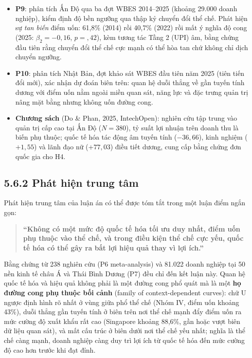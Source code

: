 \documentclass[
  a4paper,
  13pt]{extreport}
\begin{document}
\begin{itemize}
  hạn chế ba cụm và mang tính minh họa, nhạy cảm với phiên bản dữ liệu
  (xem Mục 4.7.8).
\item
  \textbf{P9}: phân tích Ấn Độ qua ba đợt WBES 2014--2025 (khoảng 29.000
  doanh nghiệp), kiểm định độ bền ngưỡng qua thập kỷ chuyển đổi thể chế.
  Phát hiện sự \emph{tan biến} điểm uốn: 61,8\% (2014) rồi 40,7\% (2022)
  rồi mất ý nghĩa độ cong (2025: \(\beta_2 = -0{,}16\), \(p = {,}42\)),
  kèm tương tác Tầng 2 (UPI) âm, bằng chứng đầu tiên rằng chuyển đổi thể
  chế cực mạnh có thể hòa tan chứ không chỉ dịch chuyển ngưỡng.
\item
  \textbf{P10}: phân tích Nhật Bản, đợt khảo sát WBES đầu tiên năm 2025
  (tiên tiến đổi mới), xác nhận dự đoán biên trên: quan hệ duỗi thẳng về
  gần tuyến tính dương với điểm uốn nằm ngoài miền quan sát, năng lực và
  đặc trưng quản trị nâng mặt bằng nhưng không uốn đường cong.
\item
  \textbf{Chương sách} (Do \& Phan, 2025, IntechOpen): nghiên cứu tập
  trung vào quản trị cấp cao tại Ấn Độ (\(N = 380\)), tỷ suất lợi nhuận
  trên doanh thu là biến phụ thuộc; quốc tế hóa tác động âm tuyến tính
  (\(-36{,}66\)), kinh nghiệm (\(+1{,}55\)) và lãnh đạo nữ
  (\(+77{,}03\)) điều tiết dương, cung cấp bằng chứng đơn quốc gia cho
  H4.
\end{itemize}

\hypertarget{phuxe1t-hiux1ec7n-trung-tuxe2m}{%
\subsection{5.6.2 Phát hiện trung
tâm}\label{phuxe1t-hiux1ec7n-trung-tuxe2m}}

Phát hiện trung tâm của luận án có thể được tóm tắt trong một luận điểm
ngắn gọn:

\begin{quote}
\textbf{``Không có một mức độ quốc tế hóa tối ưu duy nhất, điểm uốn phụ
thuộc vào thể chế, và trong điều kiện thể chế cực yếu, quốc tế hóa có
thể gây ra bất lợi hiệu quả thay vì lợi ích.''}
\end{quote}

Bằng chứng từ 238 nghiên cứu (P6 meta-analysis) và 81.022 doanh nghiệp
tại 50 nền kinh tế châu Á và Thái Bình Dương (P7) đều chỉ đến kết luận
này. Quan hệ quốc tế hóa và hiệu quả không phải là một đường cong phổ
quát mà là một \textbf{họ đường cong phụ thuộc bối cảnh} (family of
context-dependent curves): chữ U ngược định hình rõ nhất ở vùng giữa phổ
thể chế (Nhóm IV, điểm uốn khoảng 43\%), duỗi thẳng gần tuyến tính ở
biên trên nơi thể chế mạnh đẩy điểm uốn ra mức cường độ xuất khẩu rất
cao (Singapore khoảng 88,6\%, gần hoặc vượt biên dữ liệu quan sát), và
mất cấu trúc ở biên dưới nơi thể chế yếu nhất; nghĩa là thể chế càng
mạnh, doanh nghiệp càng duy trì lợi ích từ quốc tế hóa đến mức cường độ
cao hơn trước khi đạt đỉnh.
\end{document}
